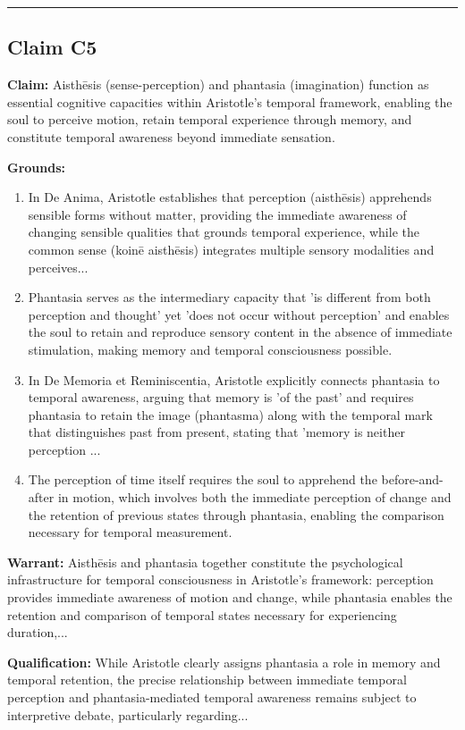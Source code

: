 \documentclass[12pt,a4paper]{article}
\begin{document}
\medskip\hrule\medskip

\subsection*{Claim C5}

\textbf{Claim:} Aisthēsis (sense-perception) and phantasia (imagination) function as essential cognitive capacities within Aristotle's temporal framework, enabling the soul to perceive motion, retain temporal experience through memory, and constitute temporal awareness beyond immediate sensation.

\textbf{Grounds:}
\begin{enumerate}[nosep]
\item In De Anima, Aristotle establishes that perception (aisthēsis) apprehends sensible forms without matter, providing the immediate awareness of changing sensible qualities that grounds temporal experience, while the common sense (koinē aisthēsis) integrates multiple sensory modalities and perceives...
\item Phantasia serves as the intermediary capacity that 'is different from both perception and thought' yet 'does not occur without perception' and enables the soul to retain and reproduce sensory content in the absence of immediate stimulation, making memory and temporal consciousness possible.
\item In De Memoria et Reminiscentia, Aristotle explicitly connects phantasia to temporal awareness, arguing that memory is 'of the past' and requires phantasia to retain the image (phantasma) along with the temporal mark that distinguishes past from present, stating that 'memory is neither perception ...
\item The perception of time itself requires the soul to apprehend the before-and-after in motion, which involves both the immediate perception of change and the retention of previous states through phantasia, enabling the comparison necessary for temporal measurement.
\end{enumerate}

\textbf{Warrant:} Aisthēsis and phantasia together constitute the psychological infrastructure for temporal consciousness in Aristotle's framework: perception provides immediate awareness of motion and change, while phantasia enables the retention and comparison of temporal states necessary for experiencing duration,...

\textbf{Qualification:} While Aristotle clearly assigns phantasia a role in memory and temporal retention, the precise relationship between immediate temporal perception and phantasia-mediated temporal awareness remains subject to interpretive debate, particularly regarding...
\end{document}
